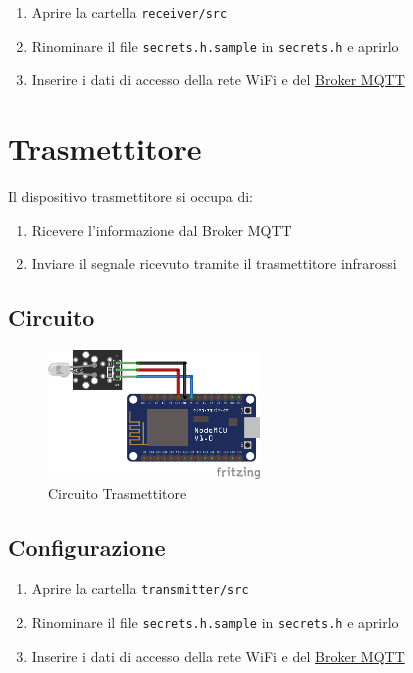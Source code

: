 \documentclass[a4paper,11pt]{article}
\begin{document}
  \begin{enumerate}
    \item Aprire la cartella \texttt{receiver/src}
    \item Rinominare il file \texttt{secrets.h.sample} in \texttt{secrets.h} e aprirlo
    \item Inserire i dati di accesso della rete WiFi e del \hyperref[sec:Broker]{Broker MQTT}
  \end{enumerate}


\section{Trasmettitore}
\label{sec:transmitter}

  Il dispositivo trasmettitore si occupa di:

  \begin{enumerate}
    \item Ricevere l'informazione dal Broker MQTT
    \item Inviare il segnale ricevuto tramite il trasmettitore infrarossi
  \end{enumerate}


  \subsection{Circuito}

    \begin{figure}[H]
      \centering
      \includegraphics[width=0.5\textwidth,height=\textheight,keepaspectratio]{assets/transmitter_fritzing}
      \caption{Circuito Trasmettitore}
    \end{figure}


  \subsection{Configurazione}

    \begin{enumerate}
      \item Aprire la cartella \texttt{transmitter/src}
      \item Rinominare il file \texttt{secrets.h.sample} in \texttt{secrets.h} e aprirlo
      \item Inserire i dati di accesso della rete WiFi e del \hyperref[sec:Broker]{Broker MQTT}
    \end{enumerate}
\end{document}
